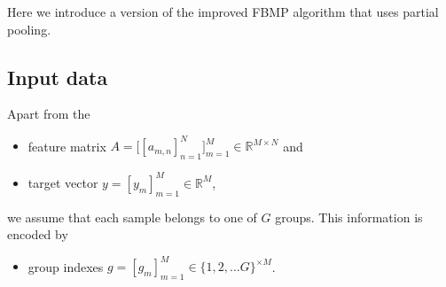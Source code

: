 \documentclass[letter,10pt,oneside]{article}
\newcommand{\no}{\noindent}
\newcommand{\+}{^\dagger}
\begin{document}
Here we introduce a version of the improved FBMP algorithm that uses partial pooling.

\subsection{Input data}
\no Apart from the 
\begin{itemize}
  \item feature matrix $A = \big[[a_{m,n}]_{n=1}^N\big]_{m=1}^M \in \mathds{R}^{M\times N}$ and
  \item target vector $y = [y_m]_{m=1}^M \in \mathds{R}^M$,
\end{itemize}
we assume that each sample belongs to one of $G$ groups. This information is encoded by
\begin{itemize}
  \item group indexes $g = [g_m]_{m=1}^M \in \{1,2,\ldots G\}^{\times M}$.
\end{itemize}
\end{document}
